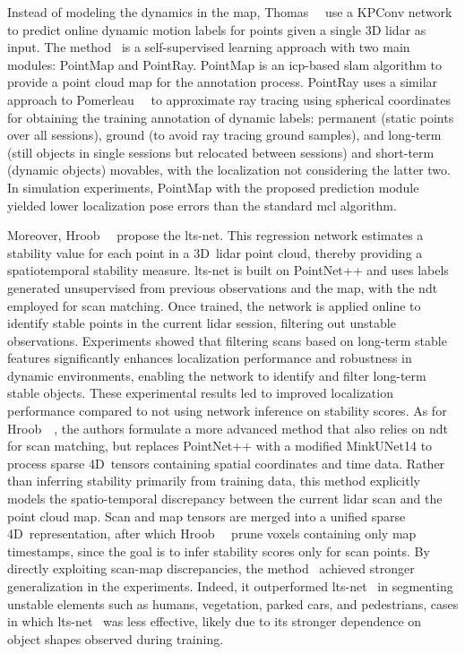 Instead of modeling the dynamics in the map,
Thomas~\etal~\cite{thomas:icra:2022} use a KPConv network to predict
online dynamic motion labels for points given a single 3D \gls{lidar} as input.
The method~\cite{thomas:icra:2022} is a self-supervised learning approach
with two main modules: PointMap and PointRay.
PointMap is an \gls{icp}-based \gls{slam} algorithm to provide
a point cloud map for the annotation process.
PointRay uses a similar approach to Pomerleau~\etal~\cite{pomerleau:icra:2014}
to approximate ray tracing using spherical coordinates
for obtaining the training annotation of dynamic labels:
permanent (static points over all sessions),
ground (to avoid ray tracing ground samples), and
long-term (still objects in single sessions but relocated between sessions) and
short-term (dynamic objects) movables,
with the localization not considering the latter two.
In simulation experiments, PointMap with the proposed prediction module
yielded lower localization pose errors than the standard \gls{mcl} algorithm.

Moreover, Hroob~\etal~\cite{hroob:ras:2024} propose the \gls{lts-net}.
This regression network estimates a stability value for each point in a
3D~\gls{lidar} point cloud, thereby providing a spatiotemporal stability measure.
\gls{lts-net} is built on PointNet++ and uses labels generated unsupervised
from previous observations and the map,
with the \gls{ndt}~\cite{magnusson:jfr:2007} employed for scan matching.
Once trained, the network is applied online to identify stable points
in the current \gls{lidar} session, filtering out unstable observations.
Experiments showed that filtering scans based on long-term stable features
significantly enhances localization performance and robustness
in dynamic environments, enabling the network to identify and filter long-term
stable objects. These experimental results led to improved localization
performance compared to not using network inference on stability scores.
As for Hroob~\etal~\cite{hroob:ral:2024}, the authors formulate a more advanced
method that also relies on \gls{ndt}~\cite{magnusson:jfr:2007} for scan
matching, but replaces PointNet++ with a modified MinkUNet14
to process sparse 4D~tensors containing spatial coordinates and time data.
Rather than inferring stability primarily from training data,
this method explicitly models the spatio-temporal discrepancy between
the current \gls{lidar} scan and the point cloud map.
Scan and map tensors are merged into a unified sparse 4D~representation, after
which Hroob~\etal~\cite{hroob:ral:2024} prune voxels containing only map
timestamps, since the goal is to infer stability scores only for scan points.
By directly exploiting scan-map discrepancies, the method~\cite{hroob:ral:2024}
achieved stronger generalization in the experiments.
Indeed, it outperformed \gls{lts-net}~\cite{hroob:ras:2024} in segmenting
unstable elements such as humans, vegetation, parked cars, and pedestrians,
cases in which \gls{lts-net}~\cite{hroob:ras:2024} was less effective,
likely due to its stronger dependence on object shapes observed during training.

